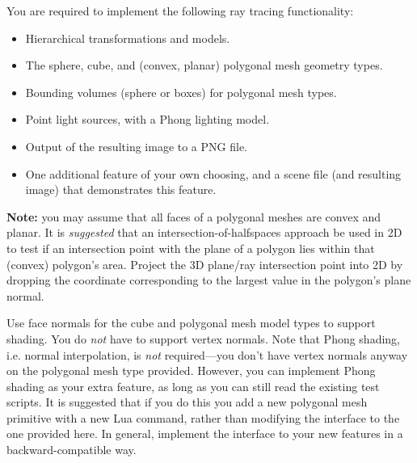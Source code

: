 
You are required to implement the following ray tracing functionality:
\begin{itemize}
	\item Hierarchical transformations and models.
	\item The sphere, cube, and (convex, planar) polygonal mesh 
              geometry types.
	\item Bounding volumes (sphere or boxes) for polygonal mesh types.
	\item Point light sources, with a Phong lighting model.
	\item Output of the resulting image to a PNG file.
	\item One additional feature of your own choosing, and 
                a scene file (and resulting image) 
		that demonstrates this feature.
\end{itemize}
{\bf Note:} you may assume that all faces of a polygonal 
meshes are convex and planar.   
It is \emph{suggested} that an
intersection-of-halfspaces approach be used in 2D to test
if an intersection point with the plane of a polygon lies within
that (convex) polygon's area.  
Project the 3D plane/ray intersection point into 2D by
dropping the coordinate corresponding to the largest value in
the polygon's plane normal.

Use face normals for the cube and polygonal mesh
model types to support shading.  
You do {\em not} have to support vertex normals.  
Note that Phong shading, i.e. normal interpolation, is
\emph{not} required---you don't have vertex normals anyway on
the polygonal mesh type provided.
However, you can implement Phong shading as your extra feature,
as long as you can still read the existing test scripts.
It is suggested that if you do this you add a new polygonal
mesh primitive with a new Lua command, rather than modifying the
interface to the one provided here.   In general, implement
the interface to your new features in a backward-compatible way.

